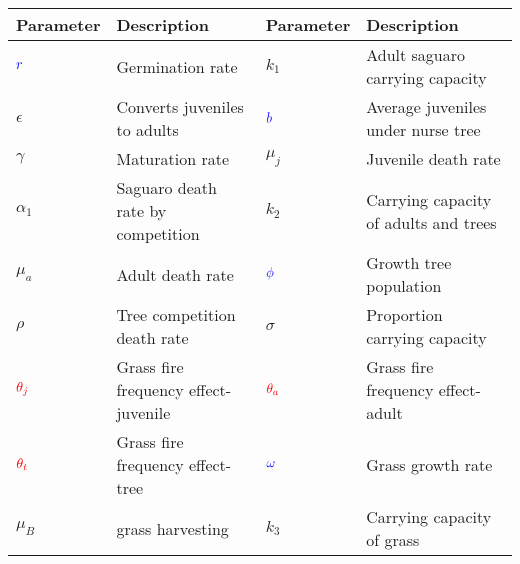 
\setlength{\arrayrulewidth}{.3mm}
\renewcommand{\arraystretch}{1.5}


{\tiny \begin{tabular}{ |p{1cm}|m{3cm}| p{1cm}| p{3cm}|}

\hline
Parameter & Description & Parameter & Description\\
\hline
$\textcolor{blue}{r}$ & Germination rate & $k_1$& Adult saguaro carrying capacity\\
\hline

$\epsilon$ & Converts juveniles to adults & $\textcolor{blue}{b}$ & Average juveniles under nurse tree\\
\hline

$\gamma$& Maturation rate & $\mu_j$ & Juvenile death rate\\
\hline

$\alpha_1$& Saguaro death rate by competition & $k_2$ & Carrying capacity of adults and trees\\
\hline

$\mu_a$ & Adult death rate & $\textcolor{blue}{\phi}$ & Growth tree population\\
\hline
$\rho$ & Tree competition death rate & $\sigma$ & Proportion carrying capacity\\
\hline
$\textcolor{red}{\theta_j}$ & Grass fire frequency effect-juvenile& $\textcolor{red}{\theta_a}$ & Grass fire frequency effect-adult\\
\hline
$\textcolor{red}{\theta_t}$ &Grass fire frequency effect-tree & $\textcolor{blue}{\omega}$ & Grass growth rate\\
\hline
$\mu_B$ & grass harvesting & $k_3$ & Carrying capacity of grass\\
\hline
\end{tabular}}